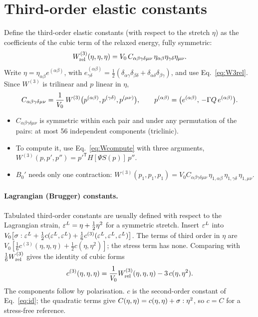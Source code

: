 \documentclass[11pt,a4paper]{article}
\newcommand{\al}{\alpha}\newcommand{\be}{\beta}\newcommand{\ga}{\gamma}\newcommand{\de}{\delta}
\newcommand{\Wt}{W^{(3)}}\newcommand{\Wf}{W^{(4)}}
\begin{document}
\section{Third-order elastic constants}
Define the third-order elastic constants (with respect to the stretch $\eta$) as the coefficients of the
cubic term of the relaxed energy, fully symmetric:
\begin{equation}
\Wt_{\rm rel}(\eta,\eta,\eta)=V_0\,C_{\al\be\ga\de\mu\nu}\,\eta_{\al\be}\eta_{\ga\de}\eta_{\mu\nu}.
\end{equation}
Write $\eta=\eta_{\al\be}e^{(\al\be)}$, with $e^{(\al\be)}_{\ga\de}=\tfrac12(\de_{\al\ga}\de_{\be\de}+\de_{\al\de}\de_{\be\ga})$, and use
Eq.~\eqref{eq:W3rel}. Since $\Wt$ is trilinear and $p$ linear in $\eta$,
\begin{equation}
C_{\al\be\ga\de\mu\nu}=\frac1{V_0}\,\Wt\big(p^{(\al\be)},p^{(\ga\de)},p^{(\mu\nu)}\big),\qquad
p^{(\al\be)}=\big(e^{(\al\be)},\,-\Ga Q\,e^{(\al\be)}\big).
\label{eq:C3}
\end{equation}
\begin{itemize}
\item $C_{\al\be\ga\de\mu\nu}$ is symmetric within each pair and under any permutation of the pairs:
  at most 56 independent components (triclinic).
\item To compute it, use Eq.~\eqref{eq:Wcompute} with three arguments,
  $\Wt(p,p',p'')=p'^{\mathsf T}H[\Psi S(p)]\,p''$.
\item $B_0'$ needs only one contraction: $\Wt(p_1,p_1,p_1)=V_0C_{\al\be\ga\de\mu\nu}\,\eta_{1,\al\be}\,\eta_{1,\ga\de}\,\eta_{1,\mu\nu}$.
\end{itemize}

\paragraph{Lagrangian (Brugger) constants.} Tabulated third-order constants are usually defined with
respect to the Lagrangian strain, $\varepsilon^L=\eta+\tfrac12\eta^2$ for a symmetric stretch. Insert $\varepsilon^L$ into
$V_0\big[\sigma:\varepsilon^L+\tfrac12c(\varepsilon^L,\varepsilon^L)+\tfrac16c^{(3)}(\varepsilon^L,\varepsilon^L,\varepsilon^L)\big]$. The terms of third
order in $\eta$ are $V_0[\tfrac16c^{(3)}(\eta,\eta,\eta)+\tfrac12c(\eta,\eta^2)]$; the stress term has none. Comparing
with $\tfrac16\Wt_{\rm rel}$ gives the identity of cubic forms
\begin{equation}
c^{(3)}(\eta,\eta,\eta)=\frac1{V_0}\Wt_{\rm rel}(\eta,\eta,\eta)-3\,c(\eta,\eta^2).
\end{equation}
The components follow by polarisation. $c$ is the second-order constant of Eq.~\eqref{eq:id}; the
quadratic terms give $C(\eta,\eta)=c(\eta,\eta)+\sigma:\eta^2$, so $c=C$ for a stress-free reference.
\end{document}
